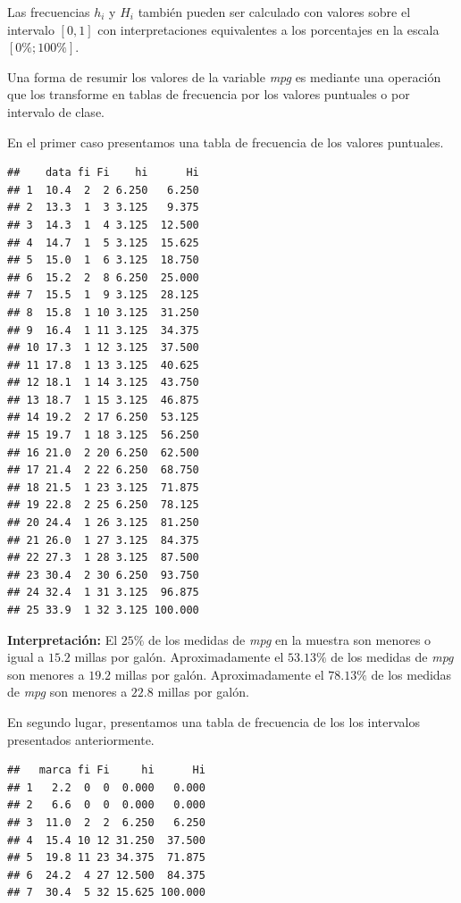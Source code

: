\documentclass[]{book}
\newenvironment{Shaded}{\begin{snugshade}}{\end{snugshade}}
\newcommand{\KeywordTok}[1]{\textcolor[rgb]{0.13,0.29,0.53}{\textbf{#1}}}
\newcommand{\NormalTok}[1]{#1}
\newcommand{\OperatorTok}[1]{\textcolor[rgb]{0.81,0.36,0.00}{\textbf{#1}}}
\theoremstyle{definition}
\theoremstyle{definition}
\theoremstyle{definition}
\theoremstyle{remark}
\begin{document}
Las frecuencias \(h_i\) y \(H_i\) también pueden ser
calculado con valores sobre el intervalo \([0,1]\) con
interpretaciones equivalentes a los porcentajes en la
escala \([0\% ; 100\%]\).

Una forma de resumir los valores de la variable \emph{mpg} es
mediante una operación que los transforme en tablas de
frecuencia por los valores puntuales o por intervalo de
clase.

En el primer caso presentamos una tabla de frecuencia de
los valores puntuales.

\begin{Shaded}
\end{Shaded}

\begin{verbatim}
##    data fi Fi    hi      Hi
## 1  10.4  2  2 6.250   6.250
## 2  13.3  1  3 3.125   9.375
## 3  14.3  1  4 3.125  12.500
## 4  14.7  1  5 3.125  15.625
## 5  15.0  1  6 3.125  18.750
## 6  15.2  2  8 6.250  25.000
## 7  15.5  1  9 3.125  28.125
## 8  15.8  1 10 3.125  31.250
## 9  16.4  1 11 3.125  34.375
## 10 17.3  1 12 3.125  37.500
## 11 17.8  1 13 3.125  40.625
## 12 18.1  1 14 3.125  43.750
## 13 18.7  1 15 3.125  46.875
## 14 19.2  2 17 6.250  53.125
## 15 19.7  1 18 3.125  56.250
## 16 21.0  2 20 6.250  62.500
## 17 21.4  2 22 6.250  68.750
## 18 21.5  1 23 3.125  71.875
## 19 22.8  2 25 6.250  78.125
## 20 24.4  1 26 3.125  81.250
## 21 26.0  1 27 3.125  84.375
## 22 27.3  1 28 3.125  87.500
## 23 30.4  2 30 6.250  93.750
## 24 32.4  1 31 3.125  96.875
## 25 33.9  1 32 3.125 100.000
\end{verbatim}

\textbf{Interpretación:} El \(25\%\) de los medidas de \emph{mpg} en
la muestra son menores o igual a \(15.2\) millas por
galón.
Aproximadamente el \(53.13\%\) de los medidas de \emph{mpg} son
menores a \(19.2\) millas por galón. Aproximadamente el
\(78.13\%\) de los medidas de \emph{mpg} son menores a \(22.8\)
millas por galón.

En segundo lugar, presentamos una tabla de frecuencia
de los los intervalos presentados anteriormente.

\begin{verbatim}
##   marca fi Fi     hi      Hi
## 1   2.2  0  0  0.000   0.000
## 2   6.6  0  0  0.000   0.000
## 3  11.0  2  2  6.250   6.250
## 4  15.4 10 12 31.250  37.500
## 5  19.8 11 23 34.375  71.875
## 6  24.2  4 27 12.500  84.375
## 7  30.4  5 32 15.625 100.000
\end{verbatim}
\end{document}
